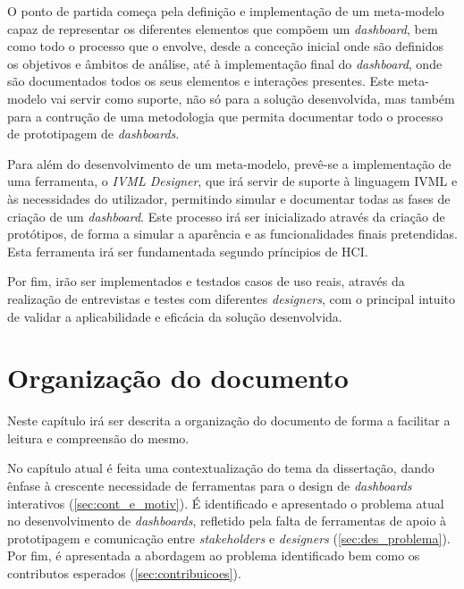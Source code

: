 O ponto de partida começa pela definição e implementação de um meta-modelo capaz de representar os diferentes elementos que compõem um \textit{dashboard}, bem como todo o processo que o envolve, desde a conceção inicial onde são definidos os objetivos e âmbitos de análise, até à implementação final do \textit{dashboard}, onde são documentados todos os seus elementos e interações presentes. Este meta-modelo vai servir como suporte, não só para a solução desenvolvida, mas também para a contrução de uma metodologia que permita documentar todo o processo de prototipagem de \textit{dashboards}.

Para além do desenvolvimento de um meta-modelo, prevê-se a implementação de uma ferramenta, o \textit{IVML Designer}, que irá servir de suporte à linguagem \gls{IVML} e às necessidades do utilizador, permitindo simular e documentar todas as fases de criação de um \textit{dashboard}. Este processo irá ser inicializado através da criação de protótipos, de forma a simular a aparência e as funcionalidades finais pretendidas. Esta ferramenta irá ser fundamentada segundo príncipios de \gls{HCI}.

Por fim, irão ser implementados e testados casos de uso reais, através da realização de entrevistas e testes com diferentes \textit{designers}, com o principal intuito de validar a aplicabilidade e eficácia da solução desenvolvida. 

\section{Organização do documento}
\label{sec:organizacao}

Neste capítulo irá ser descrita a organização do documento de forma a facilitar a leitura e compreensão do mesmo. 

No capítulo atual é feita uma contextualização do tema da dissertação, dando ênfase à crescente necessidade de ferramentas para o design de \textit{dashboards} interativos (\ref{sec:cont_e_motiv}). É identificado e apresentado o problema atual no desenvolvimento de \textit{dashboards}, refletido pela falta de ferramentas de apoio à prototipagem e comunicação entre \textit{stakeholders} e \textit{designers} (\ref{sec:des_problema}). Por fim, é apresentada a abordagem ao problema identificado bem como os contributos esperados (\ref{sec:contribuicoes}).

